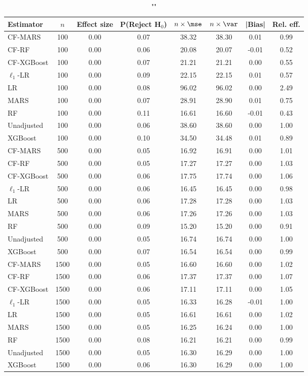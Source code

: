 \begin{table}
\centering
\caption{""}
\begin{tabular}{lccccccc}
\toprule
Estimator & $n$ & Effect size & P(Reject H$_0$) & $n\times\mse$ & $n\times \var$ & |Bias| & Rel. eff.\\ \midrule
CF-MARS & 100 & 0.00 & 0.07 & 38.32 & 38.30 &  0.01 & 0.99 \\ 
CF-RF & 100 & 0.00 & 0.06 & 20.08 & 20.07 & -0.01 & 0.52 \\ 
CF-XGBoost & 100 & 0.00 & 0.07 & 21.21 & 21.21 &  0.00 & 0.55 \\ 
$\ell_1$-LR & 100 & 0.00 & 0.09 & 22.15 & 22.15 &  0.01 & 0.57 \\ 
LR & 100 & 0.00 & 0.08 & 96.02 & 96.02 &  0.00 & 2.49 \\ 
MARS & 100 & 0.00 & 0.07 & 28.91 & 28.90 &  0.01 & 0.75 \\ 
RF & 100 & 0.00 & 0.11 & 16.61 & 16.60 & -0.01 & 0.43 \\ 
Unadjusted & 100 & 0.00 & 0.06 & 38.60 & 38.60 &  0.00 & 1.00 \\ 
XGBoost & 100 & 0.00 & 0.10 & 34.50 & 34.48 &  0.01 & 0.89 \\ \addlinespace 
CF-MARS & 500 & 0.00 & 0.05 & 16.92 & 16.91 &  0.00 & 1.01 \\ 
CF-RF & 500 & 0.00 & 0.05 & 17.27 & 17.27 &  0.00 & 1.03 \\ 
CF-XGBoost & 500 & 0.00 & 0.06 & 17.75 & 17.74 &  0.00 & 1.06 \\ 
$\ell_1$-LR & 500 & 0.00 & 0.06 & 16.45 & 16.45 &  0.00 & 0.98 \\ 
LR & 500 & 0.00 & 0.06 & 17.28 & 17.28 &  0.00 & 1.03 \\ 
MARS & 500 & 0.00 & 0.06 & 17.26 & 17.26 &  0.00 & 1.03 \\ 
RF & 500 & 0.00 & 0.09 & 15.20 & 15.20 &  0.00 & 0.91 \\ 
Unadjusted & 500 & 0.00 & 0.05 & 16.74 & 16.74 &  0.00 & 1.00 \\ 
XGBoost & 500 & 0.00 & 0.07 & 16.54 & 16.54 &  0.00 & 0.99 \\ \addlinespace 
CF-MARS & 1500 & 0.00 & 0.05 & 16.60 & 16.60 &  0.00 & 1.02 \\ 
CF-RF & 1500 & 0.00 & 0.06 & 17.37 & 17.37 &  0.00 & 1.07 \\ 
CF-XGBoost & 1500 & 0.00 & 0.06 & 17.11 & 17.11 &  0.00 & 1.05 \\ 
$\ell_1$-LR & 1500 & 0.00 & 0.05 & 16.33 & 16.28 & -0.01 & 1.00 \\ 
LR & 1500 & 0.00 & 0.05 & 16.61 & 16.61 &  0.00 & 1.02 \\ 
MARS & 1500 & 0.00 & 0.05 & 16.25 & 16.24 &  0.00 & 1.00 \\ 
RF & 1500 & 0.00 & 0.08 & 16.21 & 16.21 &  0.00 & 0.99 \\ 
Unadjusted & 1500 & 0.00 & 0.05 & 16.30 & 16.29 &  0.00 & 1.00 \\ 
XGBoost & 1500 & 0.00 & 0.06 & 16.30 & 16.29 &  0.00 & 1.00 \\
\bottomrule
\end{tabular}
\end{table}

